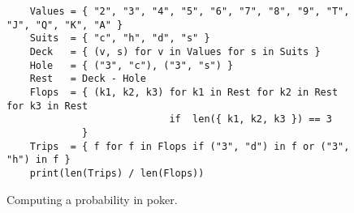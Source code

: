 \begin{figure}[!ht]
\centering
\begin{verbatim}
    Values = { "2", "3", "4", "5", "6", "7", "8", "9", "T", "J", "Q", "K", "A" } 
    Suits  = { "c", "h", "d", "s" }
    Deck   = { (v, s) for v in Values for s in Suits }
    Hole   = { ("3", "c"), ("3", "s") }
    Rest   = Deck - Hole
    Flops  = { (k1, k2, k3) for k1 in Rest for k2 in Rest for k3 in Rest 
                            if  len({ k1, k2, k3 }) == 3 
             }
    Trips  = { f for f in Flops if ("3", "d") in f or ("3", "h") in f }
    print(len(Trips) / len(Flops))
\end{verbatim}
\vspace*{-0.3cm}
\caption{Computing a probability in poker.}
\label{fig:poker-triple.py}
\end{figure}

